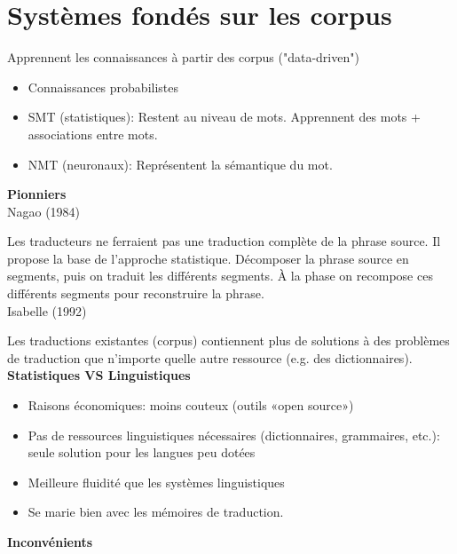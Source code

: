 \vspace{-1.2cm}

\section{Systèmes fondés sur les corpus}
\label{sec:corpus}

Apprennent les connaissances à partir des corpus ("data-driven")

\begin{itemize}
    \item Connaissances probabilistes
    \item SMT (statistiques): Restent au niveau de mots. Apprennent des mots + associations entre mots.
    \item NMT (neuronaux): Représentent la sémantique du mot.\\
\end{itemize}


\textbf{Pionniers}\\

Nagao (1984)

Les traducteurs ne ferraient pas une traduction complète de la phrase source. Il propose la base de l'approche statistique. Décomposer la phrase source en segments, puis on traduit les différents segments. À la phase on recompose ces différents segments pour reconstruire la phrase.\\

Isabelle (1992)

Les traductions existantes (corpus) contiennent plus de solutions à des problèmes de traduction que n'importe quelle autre ressource (e.g. des dictionnaires). \\

\textbf{Statistiques VS Linguistiques}

\begin{itemize}
    \item Raisons économiques: moins couteux (outils «open source»)
    \item Pas de ressources linguistiques nécessaires (dictionnaires, grammaires, etc.): seule solution pour les langues peu dotées
    \item Meilleure fluidité que les systèmes linguistiques
    \item Se marie bien avec les mémoires de traduction.\\
\end{itemize}

\textbf{Inconvénients}

